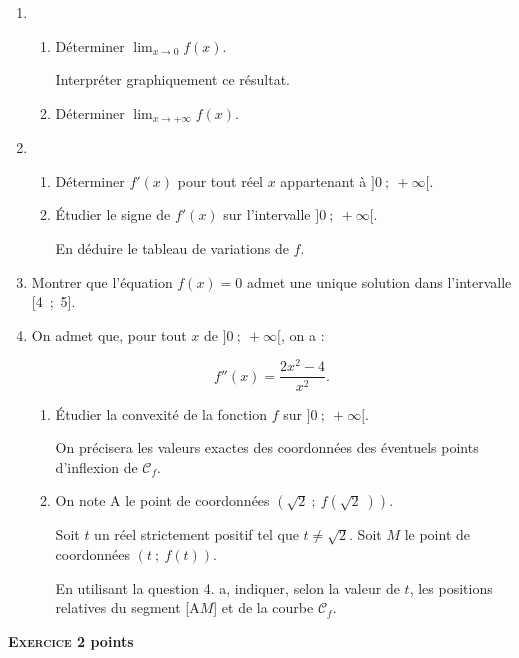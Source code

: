\documentclass[10pt,a4paper]{article}
\begin{document}
\begin{enumerate}
\item 
	\begin{enumerate}
		\item Déterminer $\displaystyle\lim_{x \to 0} f(x)$.
	
Interpréter graphiquement ce résultat.
		\item Déterminer $\displaystyle\lim_{x \to + \infty} f(x)$.
	\end{enumerate}	
\item
	\begin{enumerate}
		\item Déterminer $f'(x)$ pour tout réel $x$ appartenant à $]0~;~+ \infty[$.

		\item Étudier le signe de $f'(x)$ sur l'intervalle $]0~;~+ \infty[$.
		
En déduire le tableau de variations de $f$.
	\end{enumerate}
\item Montrer que l'équation $f(x) = 0$ admet une unique solution dans l'intervalle [4~;~5].
\item On admet que, pour tout $x$ de $]0~;~+ \infty[$, on a :

\[f''(x) = \dfrac{2x^2 - 4}{x^2}.\]

	\begin{enumerate}
		\item Étudier la convexité de la fonction $f$ sur $]0~;~+ \infty[$.
		
On précisera les valeurs exactes des coordonnées des éventuels points d'inflexion de $\mathcal{C}_f$.
		\item On note A le point de coordonnées $\left(\sqrt 2~;~f\left(\sqrt 2~\right)\right)$.
		
Soit $t$ un réel strictement positif tel que $t \ne \sqrt 2$. Soit $M$ le point de coordonnées $(t~;~ f(t))$.

En utilisant la question 4. a, indiquer, selon la valeur de $t$, les positions relatives du segment [A$M$] et de la courbe $\mathcal{C}_f$.
	\end{enumerate}
\end{enumerate}

\bigskip

\textbf{\textsc{Exercice 2}  points\hfill}
\end{document}
